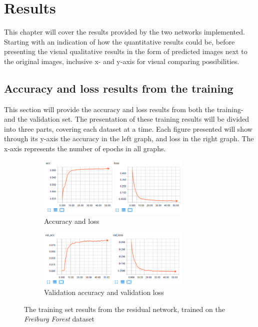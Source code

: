 \documentclass[USenglish]{ifimaster}  %
\begin{document}
\chapter{Results} 
This chapter will cover the results provided by the two networks implemented. Starting with an indication of how the quantitative results could be, before presenting the visual qualitative results in the form of predicted images next to the original images, inclusive x- and y-axis for visual comparing possibilities. 

\section{Accuracy and loss results from the training}
This section will provide the accuracy and loss results from both the training- and the validation set. The presentation of these training results will be divided into three parts, covering each dataset at a time. Each figure presented will show through its y-axis the accuracy in the left graph, and loss in the right graph. The x-axis represents the number of epochs \cite{website:epoch} in all graphs.  

\begin{figure}[H]
\centering
\begin{subfigure}[b]{\textwidth}
\centering
\includegraphics[width=0.8\textwidth]{bilder/freiburg_training/freiburg_residual_training_acc_results.png}
\caption{Accuracy and loss}
\label{fig:freiburg_residual_acc_result}
\end{subfigure}
\hfill
\begin{subfigure}[b]{\textwidth}
\centering
\includegraphics[width=0.8\textwidth]{bilder/freiburg_training/freiburg_residual_training_val_acc_results.png}
\caption{Validation accuracy and validation loss}
\label{fig:freiburg_residual_val_acc_result}
\end{subfigure}
\caption{The training set results from the residual network, trained on the \textit{Freiburg Forest} dataset}
\label{fig:freiburg_residual_result}
\end{figure}
\end{document}
